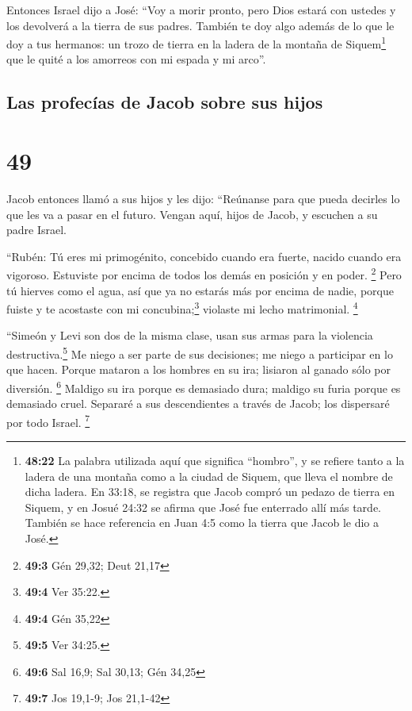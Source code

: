  Entonces Israel dijo a José: ``Voy a morir pronto, pero
Dios estará con ustedes y los devolverá a la tierra de sus padres.
 También te doy algo además de lo que le doy a tus
hermanos: un trozo de tierra en la ladera de la montaña de
Siquem\footnote{\textbf{48:22} La palabra utilizada aquí que significa
  ``hombro'', y se refiere tanto a la ladera de una montaña como a la
  ciudad de Siquem, que lleva el nombre de dicha ladera. En 33:18, se
  registra que Jacob compró un pedazo de tierra en Siquem, y en Josué
  24:32 se afirma que José fue enterrado allí más tarde. También se hace
  referencia en Juan 4:5 como la tierra que Jacob le dio a José.} que le
quité a los amorreos con mi espada y mi arco''.

\hypertarget{las-profecuxedas-de-jacob-sobre-sus-hijos}{%
\subsection{Las profecías de Jacob sobre sus
hijos}\label{las-profecuxedas-de-jacob-sobre-sus-hijos}}

\hypertarget{section-48}{%
\section{49}\label{section-48}}

 Jacob entonces llamó a sus hijos y les dijo: ``Reúnanse
para que pueda decirles lo que les va a pasar en el futuro.
 Vengan aquí, hijos de Jacob, y escuchen a su padre
Israel.

 ``Rubén: Tú eres mi primogénito, concebido cuando era
fuerte, nacido cuando era vigoroso. Estuviste por encima de todos los
demás en posición y en poder. \footnote{\textbf{49:3} Gén 29,32; Deut
  21,17}  Pero tú hierves como el agua, así que ya no
estarás más por encima de nadie, porque fuiste y te acostaste con mi
concubina;\footnote{\textbf{49:4} Ver 35:22.} violaste mi lecho
matrimonial. \footnote{\textbf{49:4} Gén 35,22}

 ``Simeón y Levi son dos de la misma clase, usan sus armas
para la violencia destructiva.\footnote{\textbf{49:5} Ver 34:25.}
 Me niego a ser parte de sus decisiones; me niego a
participar en lo que hacen. Porque mataron a los hombres en su ira;
lisiaron al ganado sólo por diversión. \footnote{\textbf{49:6} Sal 16,9;
  Sal 30,13; Gén 34,25}  Maldigo su ira porque es
demasiado dura; maldigo su furia porque es demasiado cruel. Separaré a
sus descendientes a través de Jacob; los dispersaré por todo Israel.
\footnote{\textbf{49:7} Jos 19,1-9; Jos 21,1-42}

